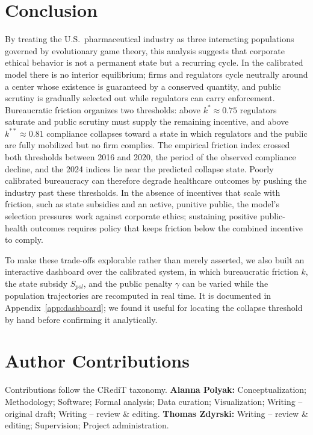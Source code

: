 \documentclass[10pt]{article}
\begin{document}
\section{Conclusion}
By treating the U.S.\ pharmaceutical industry as three interacting populations governed by evolutionary game theory, this analysis suggests that corporate ethical behavior is not a permanent state but a recurring cycle. In the calibrated model there is no interior equilibrium; firms and regulators cycle neutrally around a center whose existence is guaranteed by a conserved quantity, and public scrutiny is gradually selected out while regulators can carry enforcement. Bureaucratic friction organizes two thresholds: above $k^*\approx0.75$ regulators saturate and public scrutiny must supply the remaining incentive, and above $k^{**}\approx0.81$ compliance collapses toward a state in which regulators and the public are fully mobilized but no firm complies. The empirical friction index crossed both thresholds between 2016 and 2020, the period of the observed compliance decline, and the 2024 indices lie near the predicted collapse state. Poorly calibrated bureaucracy can therefore degrade healthcare outcomes by pushing the industry past these thresholds. In the absence of incentives that scale with friction, such as state subsidies and an active, punitive public, the model's selection pressures work against corporate ethics; sustaining positive public-health outcomes requires policy that keeps friction below the combined incentive to comply.

To make these trade-offs explorable rather than merely asserted, we also built an interactive dashboard over the calibrated system, in which bureaucratic friction $k$, the state subsidy $S_{pol}$, and the public penalty $\gamma$ can be varied while the population trajectories are recomputed in real time. It is documented in Appendix~\ref{app:dashboard}; we found it useful for locating the collapse threshold by hand before confirming it analytically.

\section*{Author Contributions}
Contributions follow the CRediT taxonomy. \textbf{Alanna Polyak:} Conceptualization; Methodology; Software; Formal analysis; Data curation; Visualization; Writing -- original draft; Writing -- review \& editing. \textbf{Thomas Zdyrski:} Writing -- review \& editing; Supervision; Project administration.
\end{document}
